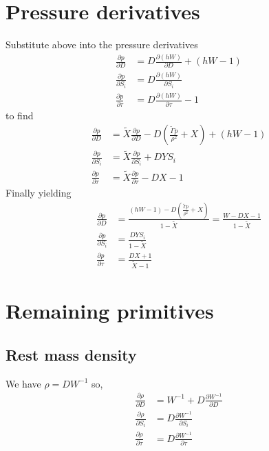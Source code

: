 \documentclass{article}
\begin{document}
\section{Pressure derivatives}
Substitute above into the pressure derivatives
\begin{align*}
  \frac{\partial p}{\partial D} &= D\frac{\partial (hW)}{\partial D} + \left(hW - 1\right)\\
  \frac{\partial p}{\partial S_i} &= D\frac{\partial (hW)}{\partial S_i}\\
  \frac{\partial p}{\partial \tau} &= D\frac{\partial (hW)}{\partial \tau} - 1
\end{align*}
to find
\begin{align*}
  \frac{\partial p}{\partial D} &= \widetilde{X}\frac{\partial p}{\partial D} - D\left(\frac{\widetilde{\Gamma} p}{\rho^2} + X\right) + \left(hW - 1\right)\\
  \frac{\partial p}{\partial S_i} &= \widetilde{X}\frac{\partial p}{\partial S_i} + D Y S_i\\
  \frac{\partial p}{\partial \tau} &= \widetilde{X}\frac{\partial p}{\partial \tau} - D X - 1
\end{align*}
Finally yielding
\begin{align*}
  \frac{\partial p}{\partial D} &= \frac{\left(hW - 1\right) - D\left(\frac{\widetilde{\Gamma} p}{\rho^2} + X\right)}{1 - \widetilde{X}} = \frac{W - D X - 1}{1 - \widetilde{X}}\\
  \frac{\partial p}{\partial S_i} &= \frac{D Y S_i}{1 - \widetilde{X}}\\
  \frac{\partial p}{\partial \tau} &= \frac{D X + 1}{\widetilde{X} - 1}
\end{align*}

\section{Remaining primitives}
\subsection{Rest mass density}
We have $\rho = D W^{-1}$ so,
\begin{align*}
  \frac{\partial \rho}{\partial D} &= W^{-1} + D\frac{\partial W^{-1}}{\partial D}\\
  \frac{\partial \rho}{\partial S_i} &= D\frac{\partial W^{-1}}{\partial S_i}\\
  \frac{\partial \rho}{\partial \tau} &= D\frac{\partial W^{-1}}{\partial \tau}
\end{align*}
\end{document}
